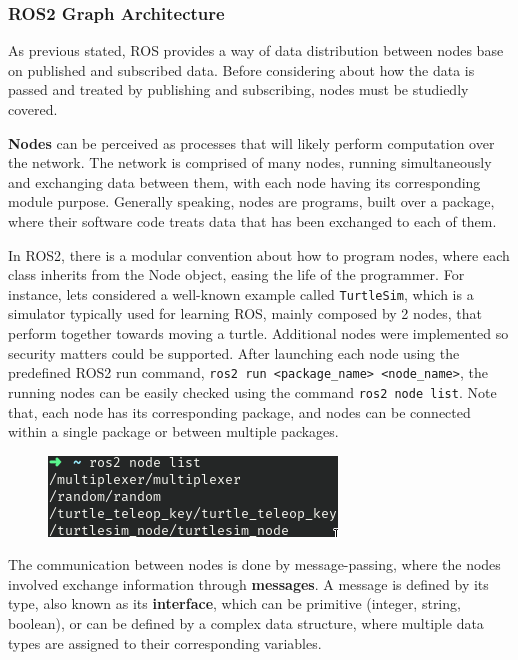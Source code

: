 \subsubsection{ROS2 Graph Architecture}

As previous stated, ROS provides a way of data distribution between nodes base on published and subscribed data. Before considering about how the data is passed and treated by publishing and subscribing, nodes must be studiedly covered.
            
\textbf{Nodes} can be perceived as processes that will likely perform computation over the network. The network is comprised of many nodes, running simultaneously and exchanging data between them, with each node having its corresponding module purpose. Generally speaking, nodes are programs, built over a package, where their software code treats data that has been exchanged to each of them.

In ROS2, there is a modular convention about how to program nodes, where each class inherits from the Node object, easing the life of the programmer.        
For instance, lets considered a well-known example called \texttt{TurtleSim}, which is a simulator typically used for learning ROS, mainly composed by 2 nodes, that perform together towards moving a turtle. Additional nodes were implemented so security matters could be supported. After launching each node using the predefined ROS2 run command, \texttt{ros2 run <package\_name> <node\_name>}, the running nodes can be easily checked using the command \texttt{ros2 node list}. Note that, each node has its corresponding package, and nodes can be connected within a single package or between multiple packages.

\begin{figure}[H]
        \centering
         \includegraphics[width=0.4\linewidth]{images/ts_nodelist.png}
\end{figure}
    
The communication between nodes is done by message-passing, where the nodes involved exchange information through \textbf{messages}. A message is defined by its type, also known as its \textbf{interface}, which can be primitive (integer, string, boolean), or can be defined by a complex data structure, where multiple data types are assigned to their corresponding variables.

